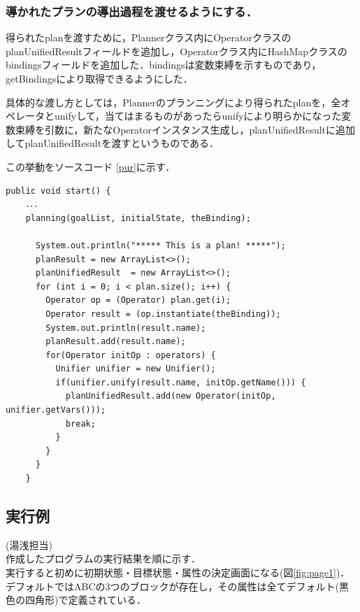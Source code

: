 \documentclass[uplatex,12pt]{jsarticle}
\begin{document}
\subsubsection{導かれたプランの導出過程を渡せるようにする．}
得られたplanを渡すために，Plannerクラス内にOperatorクラスのplanUnifiedResultフィールドを追加し，Operatorクラス内にHashMapクラスのbindingsフィールドを追加した．bindingsは変数束縛を示すものであり，getBindingsにより取得できるようにした．

具体的な渡し方としては，Plannerのプランニングにより得られたplanを，全オペレータとunifyして，当てはまるものがあったらunifyにより明らかになった変数束縛を引数に，新たなOperatorインスタンス生成し，planUnifiedResultに追加してplanUnifiedResultを渡すというものである．

この挙動をソースコード
\ref{pur}に示す．

\begin{lstlisting}[caption=Plannerクラスのstartメソッドの一部, label=pur]
  public void start() {
    ．．．
    planning(goalList, initialState, theBinding);

      System.out.println("***** This is a plan! *****");
      planResult = new ArrayList<>();
      planUnifiedResult  = new ArrayList<>();
      for (int i = 0; i < plan.size(); i++) {
        Operator op = (Operator) plan.get(i);
        Operator result = (op.instantiate(theBinding));
        System.out.println(result.name);
        planResult.add(result.name);
        for(Operator initOp : operators) {
          Unifier unifier = new Unifier();
          if(unifier.unify(result.name, initOp.getName())) {
            planUnifiedResult.add(new Operator(initOp, unifier.getVars()));
            break;
          }
        }
      }
    }
\end{lstlisting}

\subsection{実行例}
\noindent (湯浅担当) \\
作成したプログラムの実行結果を順に示す．\\
\clearpage
実行すると初めに初期状態・目標状態・属性の決定画面になる(図\ref{fig:page1})．デフォルトではABCの3つのブロックが存在し，その属性は全てデフォルト(黒色の四角形)で定義されている．\\
\end{document}
